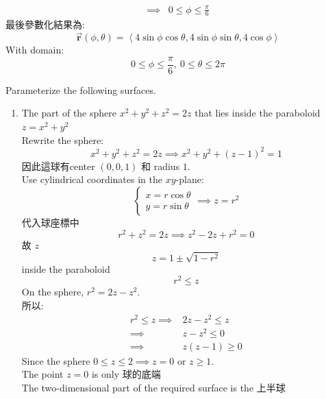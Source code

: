 ﻿\documentclass[12pt,a4paper]{article}
\begin{document}
\begin{problems}
\begin{enumerate}
\begin{align}
    \implies & 0 \leq \phi \leq \frac{\pi}{6}
  \end{align}
  最後參數化結果為:
  \begin{equation}
    \vec{\mathbf{r}}(\phi,\theta) = \left<
      4\sin\phi\cos\theta, 4\sin\phi\sin\theta, 4\cos\phi
    \right>
  \end{equation}
  With domain:
  \begin{equation}
    0\leq \phi \leq \frac{\pi}{6},~0\leq \theta\leq 2\pi
  \end{equation}
\end{enumerate}
\problem{}
Parameterize the following surfaces.
\begin{enumerate}
  \item The part of the sphere $x^2 + y^2 +z^2 =2z$ that lies inside the paraboloid $z=x^2+y^2$\\
  Rewrite the sphere:
  \begin{equation}
    x^2+y^2+z^2=2z \implies
    x^2+y^2+(z-1)^2=1
  \end{equation}
  因此這球有center $(0,0,1)$ 和 radius $1$.\\
  Use cylindrical coordinates in the $xy$-plane:
  \begin{equation}
    \begin{cases}
    x = r\cos \theta\\
    y = r\sin\theta
    \end{cases}\implies z = r^2
  \end{equation}
  代入球座標中
  \begin{equation}
    r^2+z^2=2z \implies
    z^2-2z+r^2=0
  \end{equation}
  故 $z$
  \begin{equation}
    z=1\pm\sqrt{1-r^2}
  \end{equation}
  inside the paraboloid
  \begin{equation}
    r^2\leq z
  \end{equation}
  On the sphere, $r^2=2z-z^2$.\\
  所以:
  \begin{align}
    r^2\leq z \implies&
    2z-z^2\leq z \nonumber\\
    \implies&
    z-z^2\leq0 \nonumber\\
    \implies&
    z(z-1)\geq0
  \end{align}
  Since the sphere $0\leq z\leq2 \implies z=0 \text{ or } z\geq1$.\\
  The point $z=0$ is only 球的底端\\
  The two-dimensional part of the required surface is the 上半球\\

\end{enumerate}
\end{problems}
\end{document}
